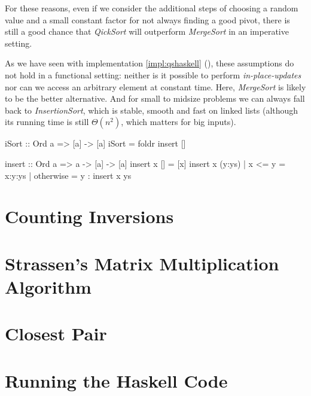 For these reasons, even if we consider the additional steps of choosing a random value and a small constant factor for not always finding a good pivot, there is still a good chance that \emph{QickSort} will outperform \emph{MergeSort} in an imperative setting.

As we have seen with implementation \ref{impl:qshaskell} (), these assumptions do not hold in a functional setting: neither is it possible to perform \emph{in-place-updates} nor can we access an arbitrary element at constant time.
Here, \emph{MergeSort} is likely to be the better alternative. 
And for small to midsize problems we can always fall back to \emph{InsertionSort}, which is stable, smooth and fast on linked lists (although its running time is still $\Theta (n^2)$, which matters for big inputs).

\begin{impl}
\end{impl}

\begin{haskellcode}
  iSort :: Ord a => [a] -> [a]
  iSort = foldr insert []

  insert :: Ord a => a -> [a] -> [a]
  insert x [] = [x]
  insert x (y:ys) | x <= y = x:y:ys
                  | otherwise = y : insert x ys
\end{haskellcode}

\section{Counting Inversions}

\section{Strassen's Matrix Multiplication Algorithm}

\section{Closest Pair}

\section{Running the Haskell Code}

